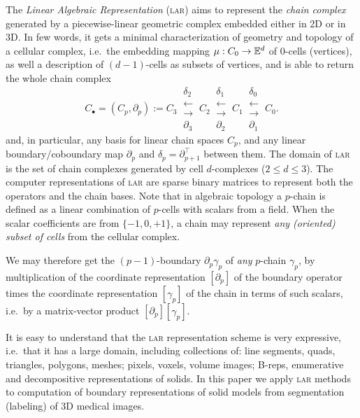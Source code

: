 The \emph{Linear Algebraic Representation} (\textsc{lar}) aims to represent the \emph{chain complex} generated by a piecewise-linear geometric complex embedded either in 2D or in 3D. In few words, it gets a minimal characterization of geometry and topology of a cellular complex, i.e.~the embedding mapping $\mu : C_0 \to \mathbb{E}^d$ of 0-cells (vertices), as well a description of $(d-1)$-cells as subsets of vertices, and is able to return the whole chain complex 
\[ 
C_\bullet = (C_p, \partial_p) := 
C_3 \ 
\substack{
\delta_2 \\
\longleftarrow \\[-1mm]
\longrightarrow \\
\partial_3 
}
\ C_2 \ 
\substack{
\delta_1 \\
\longleftarrow \\[-1mm]
\longrightarrow \\
\partial_2 
}
\ C_1 \ 
\substack{
\delta_0 \\
\longleftarrow \\[-1mm]
\longrightarrow \\
\partial_1 
}
\ C_0 .
\] 
and, in particular, any basis for linear chain spaces $C_p$, and any linear
boundary/coboundary map \(\partial_p\) and
\(\delta_p=\partial_{p+1}^\top\) between them. The domain of \textsc{lar} is the set of chain complexes generated by cell $d$-complexes ($2\leq d\leq 3$). The computer representations of \textsc{lar} are sparse binary matrices to represent both the operators and the chain bases. Note that in algebraic topology a $p$-chain is defined as a linear combination of $p$-cells with scalars from a field. When the scalar coefficients are from $\{-1, 0, +1\}$, a chain may represent \emph{any (oriented) subset of cells} from the cellular complex. 

We may therefore get the $(p-1)$-boundary $\partial_p \gamma_p$ of \emph{any} $p$-chain $\gamma_p$, by multiplication of the coordinate representation $[\partial_p]$ of the boundary operator times the coordinate representation $[\gamma_p]$ of the chain in terms of such scalars, i.e.~by a  matrix-vector product $ [\partial_p] [\gamma_p] $.

It is easy to understand that the \textsc{lar} representation scheme is very expressive, i.e.~that it  has a large domain,  including collections of: line segments, quads, triangles, polygons, meshes;  pixels, voxels, volume images; B-reps, enumerative and decompositive representations of solids. 
In this paper we apply \textsc{lar} methods to computation of boundary representations of solid models from segmentation (labeling) of 3D medical images.

